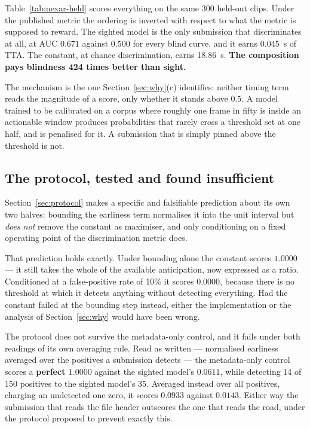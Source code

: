 Table~\ref{tab:nexar-held} scores everything on the same 300 held-out clips.
Under the published metric the ordering is inverted with respect to what the
metric is supposed to reward. The sighted model is the only submission that
discriminates at all, at AUC $0.671$ against $0.500$ for every blind curve, and
it earns \SI{0.045}{\second} of TTA. The constant, at chance discrimination,
earns \SI{18.86}{\second}. \textbf{The composition pays blindness 424 times
better than sight.}

The mechanism is the one Section~\ref{sec:why}(c) identifies: neither timing
term reads the magnitude of a score, only whether it stands above $0.5$. A
model trained to be calibrated on a corpus where roughly one frame in fifty is
inside an actionable window produces probabilities that rarely cross a
threshold set at one half, and is penalised for it. A submission that is simply
pinned above the threshold is not.

\subsection{The protocol, tested and found insufficient}

Section~\ref{sec:protocol} makes a specific and falsifiable prediction about
its own two halves: bounding the earliness term normalises it into the unit
interval but \emph{does not} remove the constant as maximiser, and only
conditioning on a fixed operating point of the discrimination metric does.

That prediction holds exactly. Under bounding alone the constant scores
$1.0000$ --- it still takes the whole of the available anticipation, now
expressed as a ratio. Conditioned at a false-positive rate of 10\% it scores
$0.0000$, because there is no threshold at which it detects anything without
detecting everything. Had the constant failed at the bounding step instead,
either the implementation or the analysis of Section~\ref{sec:why} would have
been wrong.

The protocol does not survive the metadata-only control, and it fails under
both readings of its own averaging rule. Read as written --- normalised
earliness averaged over the positives a submission detects --- the
metadata-only control scores a \textbf{perfect $1.0000$} against the sighted
model's $0.0611$, while detecting 14 of 150 positives to the sighted model's
35. Averaged instead over all positives, charging an undetected one zero, it
scores $0.0933$ against $0.0143$. Either way the submission that reads the file
header outscores the one that reads the road, under the protocol proposed to
prevent exactly this.

